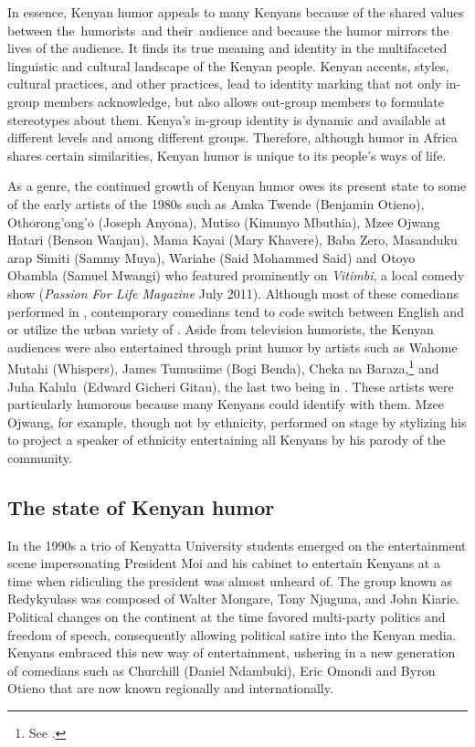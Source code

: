 \documentclass[output=paper]{langsci/langscibook}
\begin{document}
In essence, Kenyan humor appeals to many Kenyans because of the shared values between the~humorists~and their~audience and because the humor mirrors the lives of the audience. It finds its true meaning and identity in the multifaceted linguistic and cultural landscape of the Kenyan people. Kenyan accents, styles, cultural practices, and other practices, lead to identity marking that not only in-group members acknowledge, but also allows out-group members to formulate stereotypes about them. Kenya’s in-group identity is dynamic and available at different levels and among different groups. Therefore, although humor in Africa shares certain similarities, Kenyan humor is unique to its people’s ways of life.

As a genre, the continued growth of Kenyan humor owes its present state to some of the early artists of the 1980s such as Amka Twende (Benjamin Otieno), Othorong’ong’o (Joseph Anyona), Mutiso (Kimunyo Mbuthia), Mzee Ojwang Hatari (Benson Wanjau), Mama Kayai (Mary Khavere), Baba Zero, Masanduku arap Simiti (Sammy Muya), Wariahe (Said Mohammed Said) and Otoyo Obambla (Samuel Mwangi) who featured prominently on \textit{Vitimbi}, a local  comedy show (\textit{Passion For Life Magazine} July 2011). Although most of these comedians performed in , contemporary comedians tend to code switch between English and  or utilize the urban variety of . Aside from television humorists, the Kenyan audiences were also entertained through print humor by artists such as Wahome Mutahi (Whispers), James Tumusiime (Bogi Benda), Cheka na Baraza,\footnote{ See \citet{Rhoades1977}.} and Juha Kalulu~(Edward Gicheri Gitau), the last two being in . These artists were particularly humorous because many Kenyans could identify with them. Mzee Ojwang, for example, though not  by ethnicity, performed on stage by stylizing his  to project a  speaker of  ethnicity entertaining all Kenyans by his parody of the  community.

\subsection{The state of Kenyan humor}\label{sec:muaka:1.3}

In the 1990s a trio of Kenyatta University students emerged on the entertainment scene impersonating President Moi and his cabinet to entertain Kenyans at a time when ridiculing the president was almost unheard of. The group known as Redykyulass was composed of Walter Mongare, Tony Njuguna, and John Kiarie. Political changes on the continent at the time favored multi-party politics and freedom of speech, consequently allowing political satire into the Kenyan media. Kenyans embraced this new way of entertainment, ushering in a new generation of comedians such as Churchill (Daniel Ndambuki), Eric Omondi and Byron Otieno that are now known regionally and internationally. 
\end{document}
